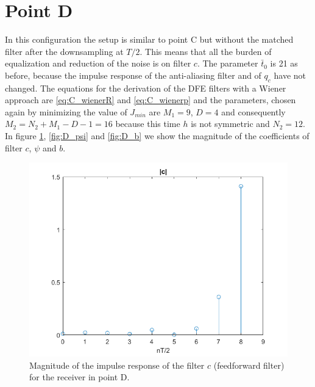\documentclass[a4paper,11.5pt]{article}
\begin{document}
\section*{Point D} 

In this configuration the setup is similar to point C but without the matched filter after the downsampling at $T/2$. This means that all the burden of equalization and reduction of the noise is on filter $c$. The parameter $\bar{t}_0$ is 21 as before, because the impulse response of the anti-aliasing filter and of $q_c$ have not changed. The equations for the derivation of the DFE filters with a Wiener approach are \ref{eq:C_wienerR} and \ref{eq:C_wienerp} and the parameters, chosen again by minimizing the value of $J_{min}$ are $M_1=9$, $D=4$ and consequently $M_2=N_2+M_1-D-1=16$ because this time $h$ is not symmetric and $N_2=12$. In figure \ref{fig:D_c}, \ref{fig:D_psi} and \ref{fig:D_b} we show the magnitude of the coefficients of filter $c$, $\psi$ and $b$.

\begin{figure}[ht]
	\begin{center}   
		\includegraphics[width=\textwidth]{figs/D_c.png} 
		\caption{Magnitude of the impulse response of the filter $c$ (feedforward filter) for the receiver in point D.}
		\label{fig:D_c}
	\end{center}
\end{figure}
\end{document}
